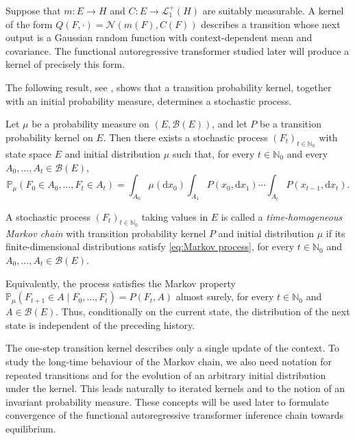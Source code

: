\begin{example}
Suppose that \(m:E\to H\) and \(C:E\to\mathcal L_1^+(H)\) are suitably measurable. A kernel of the form \(Q(F,\cdot)=\mathcal N(m(F),C(F))\) describes a transition whose next output is a Gaussian random function with context-dependent mean and covariance. The functional autoregressive transformer studied later will produce a kernel of precisely this form.
\end{example}

The following result, see \cite[Theorem 3.4.1.]{MeynTweedie2009}, shows that a transition probability kernel, together with an initial probability measure, determines a stochastic process.

\begin{theorem}\label{thm:Existence of the Markov process}
Let \(\mu\) be a probability measure on \((E,\mathcal B(E))\), and let \(P\) be a transition probability kernel on \(E\). Then there exists a stochastic process \((F_t)_{t\in\mathbb N_0}\) with state space \(E\) and initial distribution \(\mu\) such that, for every \(t\in\mathbb N_0\) and every \(A_0,\ldots,A_t\in\mathcal B(E)\),
\begin{equation}\label{eq:Markov process}
\mathbb P_\mu(F_0\in A_0,\ldots,F_t\in A_t) = \int_{A_0}\mu(\mathrm dx_0) \int_{A_1}P(x_0,\mathrm dx_1) \cdots \int_{A_t}P(x_{t-1},\mathrm dx_t).
\end{equation}
\end{theorem}

\begin{definition}
A stochastic process \((F_t)_{t\in\mathbb N_0}\) taking values in \(E\) is called a \emph{time-homogeneous Markov chain} with transition probability kernel \(P\) and initial distribution \(\mu\) if its finite-dimensional distributions satisfy \eqref{eq:Markov process}, for every \(t\in\mathbb N_0\) and \(A_0,\ldots,A_t\in\mathcal B(E)\).

Equivalently, the process satisfies the Markov property \(\mathbb P_\mu(F_{t+1}\in A\mid F_0,\ldots,F_t)=P(F_t,A)\) almost surely, for every \(t\in\mathbb N_0\) and \(A\in\mathcal B(E)\). Thus, conditionally on the current state, the distribution of the next state is independent of the preceding history.
\end{definition}

The one-step transition kernel describes only a single update of the context. To study the long-time behaviour of the Markov chain, we also need notation for repeated transitions and for the evolution of an arbitrary initial distribution under the kernel. This leads naturally to iterated kernels and to the notion of an invariant probability measure. These concepts will be used later to formulate convergence of the functional autoregressive transformer inference chain towards equilibrium.

